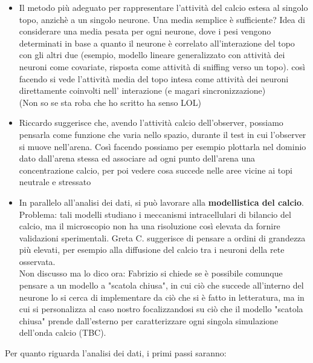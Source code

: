 \documentclass[a4paper]{article}
\begin{document}
\begin{itemize}
	\item Il metodo più adeguato per rappresentare l'attività del calcio estesa al singolo topo, anzichè a un singolo neurone. Una media semplice è sufficiente? Idea di considerare una media pesata per ogni neurone, dove i pesi vengono determinati in base a quanto il neurone è correlato all'interazione del topo con gli altri due (esempio, modello lineare generalizzato con attività dei neuroni come covariate, risposta come attività di sniffing verso un topo). così facendo si vede l'attività media del topo intesa come attività dei neuroni direttamente coinvolti nell' interazione (e magari sincronizzazione) \\
	(Non so se sta roba che ho scritto ha senso LOL)
	
	\item Riccardo suggerisce che, avendo l'attività calcio dell'observer,  possiamo pensarla come funzione che varia nello spazio, durante il test in cui l'observer si muove nell'arena. Così facendo possiamo per esempio plottarla nel dominio dato dall'arena stessa ed associare ad ogni punto dell'arena una concentrazione calcio, per poi vedere cosa succede nelle aree vicine ai topi neutrale e stressato
	
	\item In parallelo all'analisi dei dati, si può lavorare alla \textbf{modellistica del calcio}. Problema: tali modelli studiano i meccanismi intracellulari di bilancio del calcio, ma il microscopio non ha una risoluzione così elevata da fornire validazioni sperimentali. Greta C. suggerisce di pensare a ordini di grandezza più elevati, per esempio alla diffusione del calcio tra i neuroni della rete osservata. \\
	Non discusso ma lo dico ora: Fabrizio si chiede se è possibile comunque pensare  a un modello a "scatola chiusa", in cui ciò che succede all'interno del neurone lo si cerca di implementare da ciò che si è fatto in letteratura, ma in cui si personalizza al caso nostro focalizzandosi su ciò che il modello "scatola chiusa" prende dall'esterno per caratterizzare ogni singola simulazione dell'onda calcio (TBC).
\end{itemize}

Per quanto riguarda l'analisi dei dati, i primi passi saranno:
\end{document}
